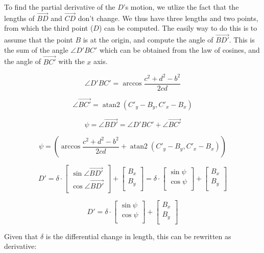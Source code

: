 \documentclass[11pt]{article}
\DeclareMathOperator{\atantwo}{atan2}
\begin{document}
To find the partial derivative of the $D$'s motion, we utlize the fact that the lengths of $\vec{BD}$ and $\vec{CD}$ don't change.
We thus have three lengths and two points, from which the third point ($D$) can be computed. The easily way to do this
is to assume that the point $B$ is at the origin, and compute the angle of $\vec{BD'}$. This is the sum of the angle $\angle D'BC'$
which can be obtained from the law of cosines, and the angle of $\vec{BC'}$ with the $x$ axis.

\[
\angle D'BC' = \arccos{\frac{c^2 + d^2 - b^2}{2cd}}
\]

\[
\angle \vec{BC'} = \atantwo( C'_y - B_y ,  C'_x - B_x )
\]

\[
\psi = \angle \vec{BD'} = \angle D'BC' + \angle \vec{BC'}
\]

\[
\psi = (\arccos{\frac{c^2 + d^2 - b^2}{2cd}} +  \atantwo( C'_y - B _y,  C'_x - B_x))
\]

\[
D' = \delta \cdot \begin{bmatrix}
          \sin{ \angle \vec{BD'} } \\
          \cos{ \angle \vec{BD'} } \\
\end{bmatrix} +
\begin{bmatrix}
           B_x  \\
           B_y \\
\end{bmatrix} =
\delta \cdot 
\begin{bmatrix}
          \sin{ \psi } \\
          \cos{ \psi } \\
\end{bmatrix} +
\begin{bmatrix}
           B_x  \\
           B_y \\
         \end{bmatrix}
\]

\[
D' =
\delta \cdot 
\begin{bmatrix}
          \sin{ \psi } \\
          \cos{ \psi } \\
\end{bmatrix} +
\begin{bmatrix}
           B_x  \\
           B_y \\
         \end{bmatrix}
\]

Given that $\delta$ is the differential change in length, this can be rewritten as derivative:
\end{document}
